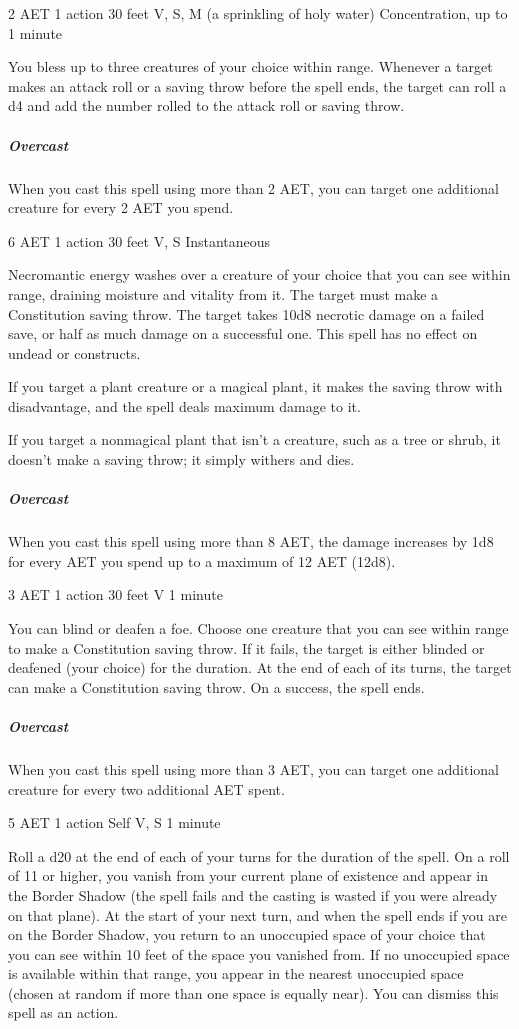 {2 AET}
{1 action}
{30 feet}
{V, S, M (a sprinkling of holy water)}
{Concentration, up to 1 minute}

You bless up to three creatures of your choice within range. Whenever a target makes an attack roll or a saving throw before the spell ends, the target can roll a d4 and add the number rolled to the attack roll or saving throw.

\subparagraph*{Overcast} When you cast this spell using more than 2 AET, you can target one additional creature for every 2 AET you spend.


{6 AET}
{1 action}
{30 feet}
{V, S}
{Instantaneous}

Necromantic energy washes over a creature of your choice that you can see within range, draining moisture and vitality from it. The target must make a Constitution saving throw. The target takes 10d8 necrotic damage on a failed save, or half as much damage on a successful one. This spell has no effect on undead or constructs.

If you target a plant creature or a magical plant, it makes the saving throw with disadvantage, and the spell deals maximum damage to it.

If you target a nonmagical plant that isn't a creature, such as a tree or shrub, it doesn't make a saving throw; it simply withers and dies.

\subparagraph*{Overcast} When you cast this spell using more than 8 AET, the damage increases by 1d8 for every AET you spend up to a maximum of 12 AET (12d8).


{3 AET}
{1 action}
{30 feet}
{V}
{1 minute}

You can blind or deafen a foe. Choose one creature that you can see within range to make a Constitution saving throw. If it fails, the target is either blinded or deafened (your choice) for the duration. At the end of each of its turns, the target can make a Constitution saving throw. On a success, the spell ends.

\subparagraph*{Overcast} When you cast this spell using more than 3 AET, you can target one additional creature for every two additional AET spent.


{5 AET}
{1 action}
{Self}
{V, S}
{1 minute}

Roll a d20 at the end of each of your turns for the duration of the spell. On a roll of 11 or higher, you vanish from your current plane of existence and appear in the Border Shadow (the spell fails and the casting is wasted if you were already on that plane). At the start of your next turn, and when the spell ends if you are on the Border Shadow, you return to an unoccupied space of your choice that you can see within 10 feet of the space you vanished from. If no unoccupied space is available within that range, you appear in the nearest unoccupied space (chosen at random if more than one space is equally near). You can dismiss this spell as an action.

